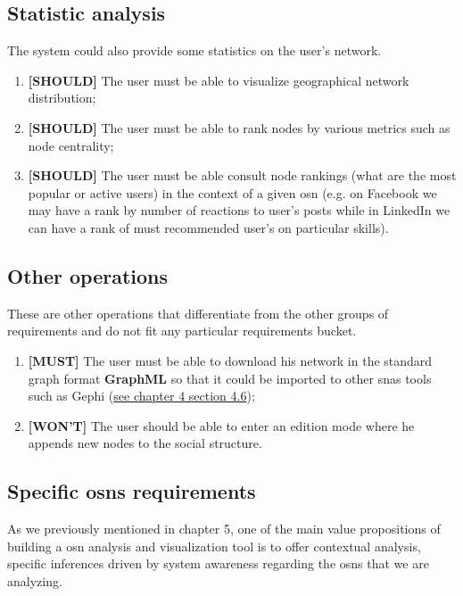\subsection{Statistic analysis}

The system could also provide some statistics on the user's network.

\begin{enumerate}
    \item \textbf{[SHOULD]} The user must be able to visualize geographical network distribution;
    \item \textbf{[SHOULD]} The user must be able to rank nodes by various metrics such as node centrality;
    \item \textbf{[SHOULD]} The user must be able consult node rankings (what are the most popular or active users) in the context of a given \gls{osn} (e.g. on Facebook we may have a rank by number of reactions to user's posts while in LinkedIn we can have a rank of must recommended user's on particular skills).
\end{enumerate}

\subsection{Other operations}

These are other operations that differentiate from the other groups of requirements and do not fit any particular requirements bucket.

\begin{enumerate}
    \item \textbf{[MUST]} The user must be able to download his network in the standard graph format \textbf{GraphML} \cite{brandes2001graphml} so that it could be imported to other \glspl{sna} tools such as Gephi (\hyperref[sec:snas]{see chapter 4 section 4.6});
    \item \textbf{[WON'T]} The user should be able to enter an edition mode where he appends new nodes to the social structure.
\end{enumerate}


\subsection{Specific \glspl{osn} requirements}

As we previously mentioned in chapter 5, one of the main value propositions of building a \gls{osn} analysis and visualization tool is to offer contextual analysis, specific inferences driven by system awareness regarding the \glspl{osn} that we are analyzing.

